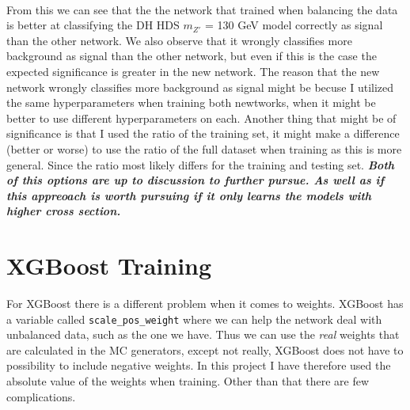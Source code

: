 \documentclass[14pt, a4paper]{book}
\begin{document}
\\From this we can see that the the network that trained when balancing the data is better at classifying the DH HDS $m_{Z'}$ = 130 GeV model correctly as signal than the other network. We also observe that it wrongly classifies more background as signal than the other network, but even if this is the case the expected significance is greater in the new network.
The reason that the new network wrongly classifies more background as signal might be becuse I utilized the same hyperparameters when training both newtworks, when it might be better to use different hyperparameters on each. 
Another thing that might be of significance is that I used the ratio of the training set, it might make a difference (better or worse) to use the ratio of the full dataset when training as this is more general. Since the ratio most likely differs for the training and testing set. \textit{\textbf{Both of this options are up to discussion to further pursue. As well as if this appreoach is worth pursuing if it only learns the models with higher cross section.}}


\clearpage

\graphicspath{{../../figures/}}

\section{XGBoost Training}
For XGBoost there is a different problem when it comes to weights. XGBoost has a variable called \verb|scale_pos_weight| where we can help the network deal with unbalanced data, such as the one we have. Thus we can use the \textit{real} weights that are calculated in the MC generators, except not really, XGBoost does not have to possibility to include negative weights. In this project I have therefore used the absolute value of the weights when training. Other than that there are few complications. 
\end{document}
